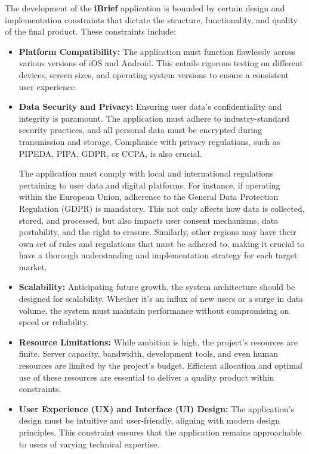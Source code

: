 The development of the \textbf{iBrief} application is bounded by certain design and implementation constraints that dictate the structure, functionality, and quality of the final product. These constraints include:

\begin{itemize}
    \item \textbf{Platform Compatibility:} The application must function flawlessly across various versions of \gls{iOS} and \gls{Android}. This entails rigorous testing on different devices, screen sizes, and operating system versions to ensure a consistent user experience.
    
    \item \textbf{Data Security and Privacy:} Ensuring user data's confidentiality and integrity is paramount. The application must adhere to industry-standard security practices, and all personal data must be encrypted during transmission and storage. Compliance with privacy regulations, such as \gls{PIPEDA}, \gls{PIPA}, \gls{GDPR}, or \gls{CCPA}, is also crucial. 
    
    The application must comply with local and international regulations pertaining to user data and digital platforms. For instance, if operating within the European Union, adherence to the General Data Protection Regulation (\gls{GDPR}) is mandatory. This not only affects how data is collected, stored, and processed, but also impacts user consent mechanisms, data portability, and the right to erasure. Similarly, other regions may have their own set of rules and regulations that must be adhered to, making it crucial to have a thorough understanding and implementation strategy for each target market.
    
    \item \textbf{Scalability:} Anticipating future growth, the system architecture should be designed for \gls{scalability}. Whether it's an influx of new users or a surge in data volume, the system must maintain performance without compromising on speed or reliability.
    
    \item \textbf{Resource Limitations:} While ambition is high, the project's resources are finite. Server capacity, bandwidth, development tools, and even human resources are limited by the project's budget. Efficient allocation and optimal use of these resources are essential to deliver a quality product within constraints.
    
    \item \textbf{User Experience (UX) and Interface (UI) Design:} The application's design must be intuitive and user-friendly, aligning with modern design principles. This constraint ensures that the application remains approachable to users of varying technical expertise.
    

\end{itemize}
